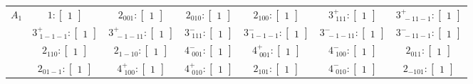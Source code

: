 \documentclass[fleqn,8pt,landscape]{jsarticle}
\begin{document}
\begin{longtable}{ccccccc}
$ A_{1} $ & $ 1:\begin{bmatrix} 1 \end{bmatrix} $ & $ 2{}_{001}:\begin{bmatrix} 1 \end{bmatrix} $ & $ 2{}_{010}:\begin{bmatrix} 1 \end{bmatrix} $ & $ 2{}_{100}:\begin{bmatrix} 1 \end{bmatrix} $ & $ 3^{+}_{\,\,111}:\begin{bmatrix} 1 \end{bmatrix} $ & $ 3^{+}_{\,\,-11-1}:\begin{bmatrix} 1 \end{bmatrix} $ \\
& $ 3^{+}_{\,\,1-1-1}:\begin{bmatrix} 1 \end{bmatrix} $ & $ 3^{+}_{\,\,-1-11}:\begin{bmatrix} 1 \end{bmatrix} $ & $ 3^{-}_{\,\,111}:\begin{bmatrix} 1 \end{bmatrix} $ & $ 3^{-}_{\,\,1-1-1}:\begin{bmatrix} 1 \end{bmatrix} $ & $ 3^{-}_{\,\,-1-11}:\begin{bmatrix} 1 \end{bmatrix} $ & $ 3^{-}_{\,\,-11-1}:\begin{bmatrix} 1 \end{bmatrix} $ \\
& $ 2{}_{110}:\begin{bmatrix} 1 \end{bmatrix} $ & $ 2{}_{1-10}:\begin{bmatrix} 1 \end{bmatrix} $ & $ 4^{-}_{\,\,001}:\begin{bmatrix} 1 \end{bmatrix} $ & $ 4^{+}_{\,\,001}:\begin{bmatrix} 1 \end{bmatrix} $ & $ 4^{-}_{\,\,100}:\begin{bmatrix} 1 \end{bmatrix} $ & $ 2{}_{011}:\begin{bmatrix} 1 \end{bmatrix} $ \\
& $ 2{}_{01-1}:\begin{bmatrix} 1 \end{bmatrix} $ & $ 4^{+}_{\,\,100}:\begin{bmatrix} 1 \end{bmatrix} $ & $ 4^{+}_{\,\,010}:\begin{bmatrix} 1 \end{bmatrix} $ & $ 2{}_{101}:\begin{bmatrix} 1 \end{bmatrix} $ & $ 4^{-}_{\,\,010}:\begin{bmatrix} 1 \end{bmatrix} $ & $ 2{}_{-101}:\begin{bmatrix} 1 \end{bmatrix} $ \\ \hline

\end{longtable}
\end{document}
